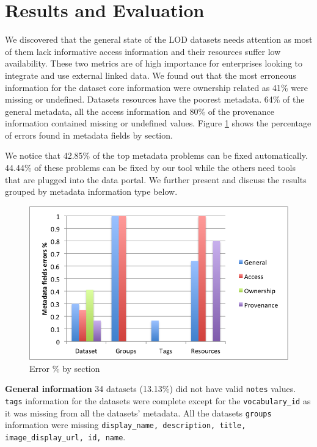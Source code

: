 \documentclass{sig-alternate}
\begin{document}
\section{Results and Evaluation}

We discovered that the general state of the LOD datasets needs attention as most of them lack informative access information and their resources suffer low availability. These two metrics are of high importance for enterprises looking to integrate and use external linked data. We found out that the most erroneous information for the dataset core information were ownership related as 41\% were missing or undefined. Datasets resources have the poorest metadata. 64\% of the general metadata, all the access information and 80\% of the provenance information contained missing or undefined values. Figure \ref{fig:1} shows the percentage of errors found in metadata fields by section.

We notice that 42.85\% of the top metadata problems can be fixed automatically. 44.44\% of these problems can be fixed by our tool while the others need tools that are plugged into the data portal. We further present and discuss the results grouped by metadata information type below.

\begin{figure}[!hpt]
\centering
\includegraphics[width=.8\linewidth]{metadata_noise_by_section.png}
\caption{Error \% by section}
\label{fig:1}
\end{figure}

\textbf{General information} 34 datasets (13.13\%) did not have valid \texttt{notes} values. \texttt{tags} information for the datasets were complete except for the \texttt{vocabulary\_id} as it was missing from all the datasets' metadata. All the datasets \texttt{groups} information were missing \texttt{display\_name, description, title, image\_display\_url, id, name}.
\end{document}
